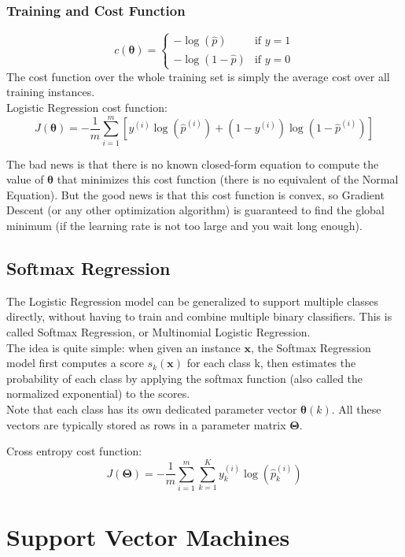 \documentclass[french]{article}
\begin{document}
\subsubsection{Training and Cost Function}
\[
    c(\bm{\theta}) =
    \begin{cases}
        -\log{(\hat p)} & \text{if $y=1$}\\
        -\log{(1 - \hat p)} & \text{if $y=0$}
    \end{cases}
\]
The cost function over the whole training set is simply the average cost over all training instances.\\
Logistic Regression cost function:
\[J(\bm{\theta}) = -\frac{1}{m} \sum_{i=1}^m [y^{(i)}\log(\hat p^{(i)}) + (1-y^{(i)})\log(1- \hat p^{(i)})]\]

The bad news is that there is no known closed-form equation to compute the value of $\bm{\theta}$ that minimizes this cost function (there is no equivalent of the Normal Equation).  But the good news is that this cost function is convex, so Gradient Descent (or any other optimization algorithm) is guaranteed to find the global minimum (if the learning rate is not too large and you wait long enough).

\subsection{Softmax Regression}

The Logistic Regression model can be generalized to support multiple classes directly, without having to train and combine multiple binary classifiers. This is called Softmax Regression, or Multinomial Logistic Regression.\\

The idea is quite simple: when given an instance $\bm{x}$, the Softmax Regression model first computes a score $s_k(\bm{x})$ for each class k, then estimates the probability of each class by applying the softmax function (also called the normalized exponential) to the scores.\\

Note that each class has its own dedicated parameter vector $\bm{\theta}(k)$. All these vectors are typically stored as rows in a parameter matrix $\bm{\Theta}$.

Cross entropy cost function:
\[J(\bm{\Theta}) = -\frac{1}{m} \sum_{i=1}^m \sum_{k=1}^K y_k^{(i)} \log(\hat p_k^{(i)})\]

\section{Support Vector Machines}
\end{document}
